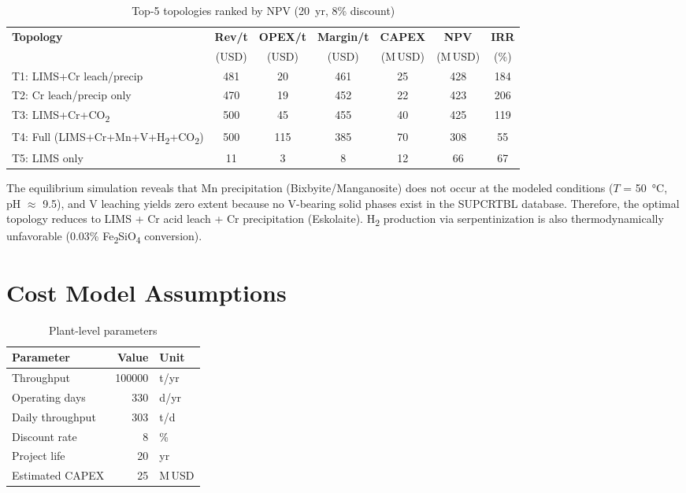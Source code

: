 \documentclass[11pt,a4paper]{article}
\begin{document}
\begin{table}[H]
\centering
\caption{Top-5 topologies ranked by NPV (20~yr, 8\% discount)}
\label{tab:trade}
\begin{tabular}{@{}lcccccc@{}}
\toprule
\textbf{Topology} & \textbf{Rev/t} & \textbf{OPEX/t} & \textbf{Margin/t} &
\textbf{CAPEX} & \textbf{NPV} & \textbf{IRR} \\
& (USD) & (USD) & (USD) & (M\,USD) & (M\,USD) & (\%) \\
\midrule
T1: LIMS+Cr leach/precip  & 481 & 20 & 461 & 25 & 428 & 184 \\
T2: Cr leach/precip only  & 470 & 19 & 452 & 22 & 423 & 206 \\
T3: LIMS+Cr+CO\textsubscript{2} & 500 & 45 & 455 & 40 & 425 & 119 \\
T4: Full (LIMS+Cr+Mn+V+H\textsubscript{2}+CO\textsubscript{2}) & 500 & 115 & 385 & 70 & 308 & 55 \\
T5: LIMS only              & 11  &  3 &   8 & 12 & 66  & 67  \\
\bottomrule
\end{tabular}
\end{table}

\noindent The equilibrium simulation reveals that Mn precipitation
(Bixbyite/Manganosite) does not occur at the modeled conditions ($T$ = \SI{50}{\degreeCelsius},
pH $\approx$ 9.5), and V leaching yields zero extent because no V-bearing solid
phases exist in the SUPCRTBL database. Therefore, the optimal topology reduces
to LIMS + Cr acid leach + Cr precipitation (Eskolaite). H\textsubscript{2}
production via serpentinization is also thermodynamically unfavorable
(0.03\% Fe\textsubscript{2}SiO\textsubscript{4} conversion).

\section{Cost Model Assumptions}

\begin{table}[H]
\centering
\caption{Plant-level parameters}
\label{tab:params}
\begin{tabular}{@{}lrl@{}}
\toprule
\textbf{Parameter} & \textbf{Value} & \textbf{Unit} \\
\midrule
Throughput         & \num{100000} & t/yr \\
Operating days     & 330          & d/yr \\
Daily throughput   & 303          & t/d  \\
Discount rate      & 8            & \%   \\
Project life       & 20           & yr   \\
Estimated CAPEX    & 25           & M\,USD \\
\bottomrule
\end{tabular}
\end{table}
\end{document}
